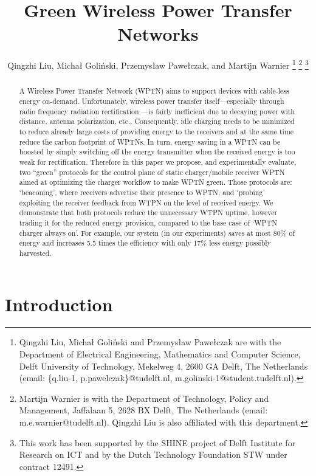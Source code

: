 \documentclass[11pt,draftclsnofoot,journal,onecolumn]{IEEEtran}
\begin{document}
\title{Green Wireless Power Transfer Networks}
\author{Qingzhi Liu, Micha{\l} Goli\'{n}ski, Przemys{\l}aw Pawe{\l}czak, and Martijn Warnier
\thanks{Qingzhi Liu, Micha{\l} Goli\'{n}ski and Przemys{\l}aw Pawe{\l}czak are with the Department of Electrical Engineering, Mathematics and Computer Science, Delft University of Technology, Mekelweg 4, 2600 GA Delft, The Netherlands (email: \{q.liu-1, p.pawelczak\}@tudelft.nl, m.golinski-1@student.tudelft.nl).}
\thanks{Martijn Warnier is with the Department of Technology, Policy and Management, Jaffalaan 5, 2628 BX Delft, The Netherlands (email: m.e.warnier@tudelft.nl). Qingzhi Liu is also affiliated with this department.}
\thanks{This work has been supported by the SHINE project of Delft Institute for Research on ICT and by the Dutch Technology Foundation STW under contract 12491.}}

\maketitle

\begin{abstract}
A Wireless Power Transfer Network (WPTN) aims to support devices with cable-less energy on-demand. Unfortunately, wireless power transfer itself---especially through radio frequency radiation rectification ---is fairly inefficient due to decaying power with distance, antenna polarization, etc.. Consequently, idle charging needs to be minimized to reduce already large costs of providing energy to the receivers and at the same time reduce the carbon footprint of WPTNs. In turn, energy saving in a WPTN can be boosted by simply switching off the energy transmitter when the received energy is too weak for rectification. Therefore in this paper we propose, and experimentally evaluate, two ``green'' protocols for the control plane of static charger/mobile receiver WPTN aimed at optimizing the charger workflow to make WPTN green. Those protocols are: `beaconing', where receivers advertise their presence to WPTN, and `probing' exploiting the receiver feedback from WTPN on the level of received energy. We demonstrate that both protocols reduce the unnecessary WTPN uptime, however trading it for the reduced energy provision, compared to the base case of `WPTN charger always on'. For example, our system (in our experiments) saves at most 80\% of energy and increases 5.5 times the efficiency with only 17\% less energy possibly harvested.
\end{abstract}

\section{Introduction}
\label{sec:introduction}
\end{document}
